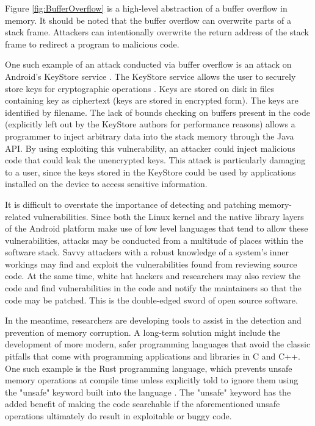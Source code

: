 Figure \ref{fig:BufferOverflow} is a high-level abstraction of a buffer overflow in memory.
It should be noted that the buffer overflow can overwrite parts of a stack frame.
Attackers can intentionally overwrite the return address of the stack frame to redirect a program to malicious code.

One such example of an attack conducted via buffer overflow is an attack on Android's KeyStore service \cite{Hay2014}.
The KeyStore service allows the user to securely store keys for cryptographic operations \cite{AndroidDocs2022Keystore}.
Keys are stored on disk in files containing key as ciphertext (keys are stored in encrypted form).
The keys are identified by filename.
The lack of bounds checking on buffers present in the code (explicitly left out by the KeyStore authors for performance reasons) allows a programmer to inject arbitrary data into the stack memory through the Java API.
By using exploiting this vulnerability, an attacker could inject malicious code that could leak the unencrypted keys.
This attack is particularly damaging to a user, since the keys stored in the KeyStore could be used by applications installed on the device to access sensitive information.

It is difficult to overstate the importance of detecting and patching memory-related vulnerabilities.
Since both the Linux kernel and the native library layers of the Android platform make use of low level languages that tend to allow these vulnerabilities, attacks may be conducted from a multitude of places within the software stack.
Savvy attackers with a robust knowledge of a system's inner workings may find and exploit the vulnerabilities found from reviewing source code.
At the same time, white hat hackers and researchers may also review the code and find vulnerabilities in the code and notify the maintainers so that the code may be patched.
This is the double-edged sword of open source software.

In the meantime, researchers are developing tools to assist in the detection and prevention of memory corruption.
A long-term solution might include the development of more modern, safer programming languages that avoid the classic pitfalls that come with programming applications and libraries in C and C++.
One such example is the Rust programming language, which prevents unsafe memory operations at compile time unless explicitly told to ignore them using the "unsafe" keyword built into the language \cite{Rust2022}.
The "unsafe" keyword has the added benefit of making the code searchable if the aforementioned unsafe operations ultimately do result in exploitable or buggy code.

